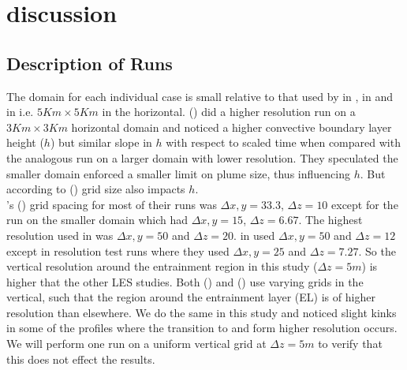 
\chapter{discussion}
\label{ch:results}
\setlength{\parindent}{0cm}

\section{Description of Runs}
\FloatBarrier

The domain for each individual case is small relative to that used by \citeauthor{SullMoengStev} in \cite{SullMoengStev}, \citeauthor{FedConzMir04} in \cite{FedConzMir04} and \citeauthor{BrooksFowler2} in \cite{BrooksFowler2} i.e. $5Km \times 5 Km$ in the horizontal.  \citeauthor{SullMoengStev} (\cite{SullMoengStev}) did a higher resolution run on a $3 Km \times 3 Km$ horizontal domain and noticed a higher convective boundary layer height ($h$) but similar slope in $h$ with respect to scaled time when compared with the analogous run on a larger domain with lower resolution.  They speculated the smaller domain enforced a smaller limit on plume size, thus influencing $h$. But according to \citeauthor{SullPat} (\cite{SullPat}) grid size also impacts $h$. \\

\citeauthor{SullMoengStev}'s (\cite{SullMoengStev}) grid spacing for most of their runs was $\Delta x, y= 33.3$, $\Delta z=10$ except for the run on the smaller domain which had $\Delta x, y = 15$, $\Delta z=6.67$.  The highest resolution \citeauthor{FedConzMir04} used in \cite{FedConzMir04} was $\Delta x, y = 50$ and $\Delta z = 20$.  \citeauthor{BrooksFowler2} in \cite{BrooksFowler2} used $\Delta x, y = 50$ and $\Delta z = 12$ except in resolution test runs where they used $\Delta x, y = 25$ and $\Delta z = 7.27$.  So the vertical resolution around the entrainment region in this study ($\Delta z= 5m$) is higher that the other LES studies. Both \citeauthor{SullMoengStev} (\cite{SullMoengStev}) and \citeauthor{BrooksFowler2} (\cite{BrooksFowler2}) use varying grids in the vertical, such that the region around the entrainment layer (\acs{EL}) is of higher resolution than elsewhere. We do the same in this study and noticed slight kinks in some of the profiles where the transition to and form higher resolution occurs. We will perform one run on a uniform vertical grid at $\Delta z=5m$ to verify that this does not effect the results.\\          

